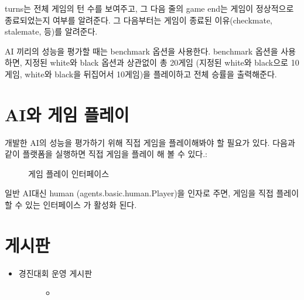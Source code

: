 \documentclass[letterpaper,10pt,english]{sphinxmanual}
\begin{document}
turns는 전체 게임의 턴 수를 보여주고, 그 다음 줄의 game end는 게임이 정상적으로 종료되었는지 여부를 알려준다.
그 다음부터는 게임이 종료된 이유(checkmate, stalemate, 등)를 알려준다.

AI 끼리의 성능을 평가할 때는 benchmark 옵션을 사용한다. benchmark 옵션을 사용하면, 지정된 white와 black 옵션과 상관없이
총 20게임 (지정된 white와 black으로 10게임, white와 black을 뒤집어서 10게임)을 플레이하고 전체 승률을 출력해준다.


\section{AI와 게임 플레이}
\label{\detokenize{index:id4}}
개발한 AI의 성능을 평가하기 위해 직접 게임을 플레이해봐야 할 필요가 있다.
다음과 같이 플랫폼을 실행하면 직접 게임을 플레이 해 볼 수 있다.:

%
\begin{sphinxVerbatim}[commandchars=\\\{\}]
   
\end{sphinxVerbatim}

\begin{figure}[htbp]
\centering
\capstart

\noindent{}
\caption{게임 플레이 인터페이스}\label{\detokenize{index:play-interface}}\label{\detokenize{index:id6}}\end{figure}

일반 AI대신 human (agents.basic.human.Player)을 인자로 주면, 게임을 직접 플레이 할 수 있는 인터페이스 {\hyperref[\detokenize{index:play-interface}]{}} 가 활성화 된다.


\section{게시판}
\label{\detokenize{index:id5}}\begin{itemize}
\item {} \begin{description}
\item[{경진대회 운영 게시판}] \leavevmode\begin{itemize}
\item {} 

\end{itemize}

\end{description}

\end{itemize}
\end{document}

